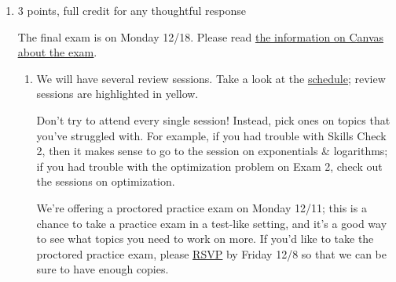 \documentclass{article}
\makeatletter
\let\@href=\href
\renewcommand{\href}[2]{\@href{#1}{\ul{#2}}}
\makeatother
\begin{document}
\begin{enumerate}
\begin{enumerate}[resume]
  \item
    \begin{problem}[\vfill]
      If a polynomial $p(x)$ has even degree, then it must be an even function. 
    \end{problem}

    \begin{solution}
      This is . A counterexample is $f(x)=x^2+x$.
    \end{solution}

  \item
    \begin{problem}[\vfill\newpage]
      If a polynomial $p(x)$ is an even function, then it must have even degree.
    \end{problem}

    \begin{solution}
      This is . If a polynomial function satisfies
      $p(-x) = p(x)$, then there cannot be \emph{any} odd powers
      of $x$ when $p(x)$ is expressed in standard form.
    \end{solution}

  \end{enumerate}

\item 

  \begin{grading}
    3 points, full credit for any thoughtful response
  \end{grading}

  The final exam is on Monday 12/18. Please read  \href{https://canvas.harvard.edu/courses/125618/pages/exams}{the information on Canvas about the exam}.

  \begin{enumerate}
  \item

    \begin{problem}[\newpage]
      We will have several review sessions. Take a look at the \href{https://canvas.harvard.edu/courses/125618/pages/office-hours-and-review-sessions}{schedule}; review sessions are highlighted in yellow.

      Don't try to attend every single session! Instead, pick ones on topics that you've struggled with. For example, if you had trouble with Skills Check 2, then it makes sense to go to the session on exponentials \& logarithms; if you had trouble with the optimization problem on Exam 2, check out the sessions on optimization.

      We're offering a proctored practice exam on Monday 12/11; this is a chance to take a practice exam in a test-like setting, and it's a good way to see what topics you need to work on more. If you'd like to take the proctored practice exam, please \href{https://forms.gle/y4QdH2kqt748Dfua9}{RSVP} by Friday 12/8 so that we can be sure to have enough copies.


\end{problem}
\end{enumerate}
\end{enumerate}
\end{document}
